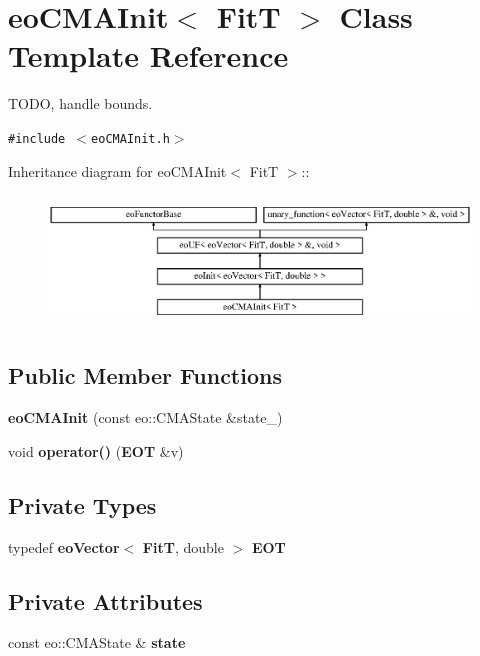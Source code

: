 \section{eo\-CMAInit$<$ Fit\-T $>$ Class Template Reference}
\label{classeo_c_m_a_init}
TODO, handle bounds.  


{\tt \#include $<$eo\-CMAInit.h$>$}

Inheritance diagram for eo\-CMAInit$<$ Fit\-T $>$::\begin{figure}[H]
\begin{center}
\leavevmode
\includegraphics[height=3.5cm]{classeo_c_m_a_init}
\end{center}
\end{figure}
\subsection*{Public Member Functions}
\begin{CompactItemize}
\item 
{\bf eo\-CMAInit} (const eo::CMAState \&state\_\-)\label{classeo_c_m_a_init_a0}

\item 
void {\bf operator()} ({\bf EOT} \&v)\label{classeo_c_m_a_init_a1}

\end{CompactItemize}
\subsection*{Private Types}
\begin{CompactItemize}
\item 
typedef {\bf eo\-Vector}$<$ {\bf Fit\-T}, double $>$ {\bf EOT}\label{classeo_c_m_a_init_y0}

\end{CompactItemize}
\subsection*{Private Attributes}
\begin{CompactItemize}
\item 
const eo::CMAState \& {\bf state}\label{classeo_c_m_a_init_r0}

\end{CompactItemize}


